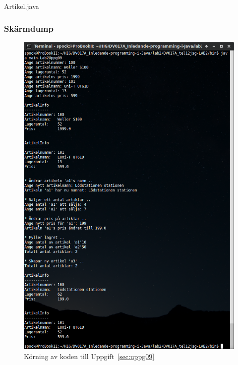 \caption{Artikel.java}
\label{src:artikel}


\subsubsection{Skärmdump}
\begin{figure}[htbp]
    \centering
        \includegraphics[width=\linewidth]{img/09.png}
    \caption{Körning av koden till Uppgift~\ref{sec:uppg09}}
    \label{fig:uppg09-screenshot}
\end{figure}

